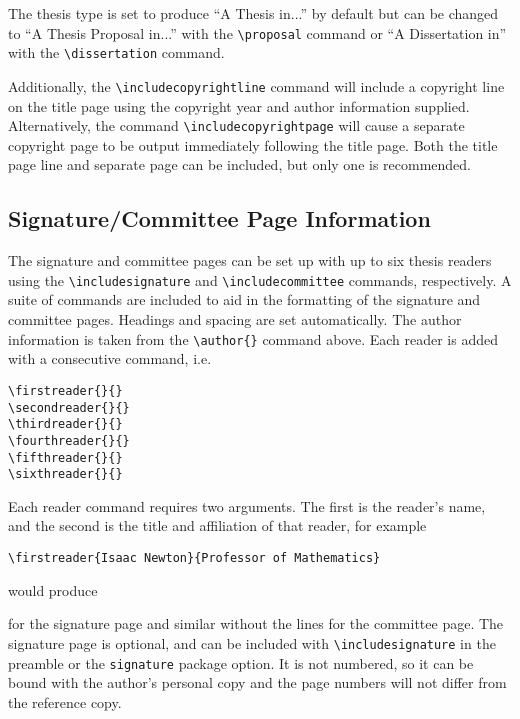 \documentclass[11pt]{article}
\begin{document}
\begin{singlespace}
The thesis type is set to produce ``A Thesis in...'' by default but can be
changed to ``A Thesis Proposal in...'' with the \verb+\proposal+ command or ``A
Dissertation in'' with the \verb+\dissertation+ command.

Additionally, the \verb+\includecopyrightline+ command will include a copyright
line on the title page using the copyright year and author information supplied.
Alternatively, the command \verb+\includecopyrightpage+ will cause a separate
copyright page to be output immediately following the title page.  Both the
title page line and separate page can be included, but only one is recommended.

\subsection*{Signature/Committee Page Information}

The signature and committee pages can be set up with up to six thesis readers
using the \verb+\includesignature+ and \verb+\includecommittee+ commands,
respectively.  A suite of commands are included to aid in the formatting of the
signature and committee pages.  Headings and spacing are set automatically.  The
author information is taken from the \verb+\author{}+ command above.  Each
reader is added with a consecutive command, i.e.

\begin{verbatim}
\firstreader{}{}
\secondreader{}{}
\thirdreader{}{}
\fourthreader{}{}
\fifthreader{}{}
\sixthreader{}{}
\end{verbatim}

Each reader command requires two arguments.  The first is the reader's name, and
the second is the title and affiliation of that reader, for example

\noindent\verb+\firstreader{Isaac Newton}{Professor of Mathematics}+ 

\noindent would produce \vspace{0.25in}

\signature{Isaac Newton \\ Professor of Mathematics \\}

\vspace{0.25in}

\noindent for the signature page and similar without the lines for the committee
page. The signature page is optional, and can be included with 
\verb+\includesignature+ in the preamble or the \verb+signature+ package option.
It is not numbered, so it can be bound with the author's personal copy and the
page numbers will not differ from the reference copy.


\end{singlespace}
\end{document}
